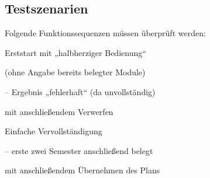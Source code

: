\newenvironment{tblitemize}{
	\begin{itemize}[nosep,leftmargin=12pt]
}{
	\end{itemize}\hspace{0pt}\vspace{-\baselineskip}
}

\newcommand{\lA}[1]{\label{A#1}A#1}

\newcommand{\refA}[1]{\hyperref[A#1]{/A#1/}}


\subsection{Testszenarien}
Folgende Funktionssequenzen müssen überprüft werden:

\begin{scenario}{Erststart mit „halbherziger Bedienung“}
	\item {} (ohne Angabe bereits belegter Module)
	\item {}
	\item {} – Ergebnis „fehlerhaft“ (da unvollständig)
	\item {} mit anschließendem Verwerfen
	\item {}
	\item {} 
	\item {}
\end{scenario}

\begin{scenario}{Einfache Vervollständigung}
	\item {}
	\item {} – erste zwei Semester anschließend belegt
	\item {}
	\item {} mit anschließendem Übernehmen des Plans
	\item {} 
	\item {}
	\item {}
\end{scenario}

